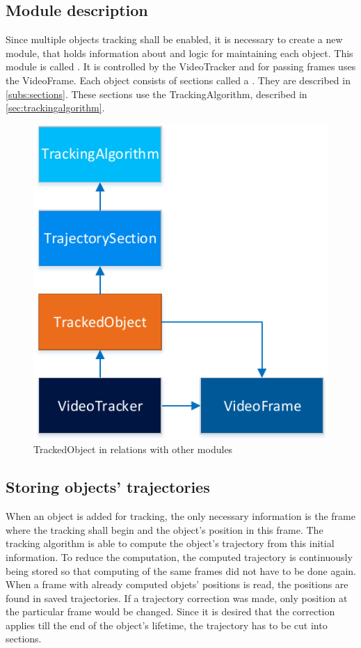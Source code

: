 \subsection{Module description}
Since multiple objects tracking shall be enabled, it is necessary to create a new module, that holds information about and logic for maintaining each object. This module is called . It is controlled by the VideoTracker and for passing frames uses the VideoFrame. Each object consists of sections called a . They are described in \autoref{subs:sections}. These sections use the TrackingAlgorithm, described in \autoref{sec:trackingalgorithm}.
\begin{figure}[!htbp]
\centering
\includegraphics{fig/trackedobject}
\caption{TrackedObject in relations with other modules}
\label{fig:videoframe}
\end{figure}

\subsection{Storing objects' trajectories}
When an object is added for tracking, the only necessary information is the frame where the tracking shall begin and the object's position in this frame. The tracking algorithm is able to compute the object's trajectory from this initial information. To reduce the computation, the computed trajectory is continuously being stored so that computing of the same frames did not have to be done again. When a frame with already computed objets' positions is read, the positions are found in saved trajectories. If a trajectory correction was made, only position at the particular frame would be changed. Since it is desired that the correction applies till the end of the object's lifetime, the trajectory has to be cut into sections.

